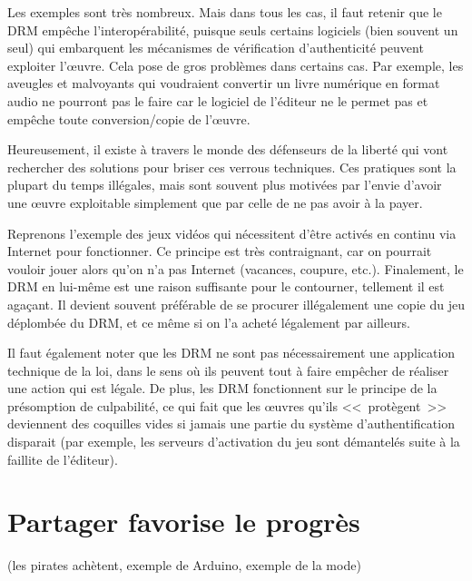 Les exemples sont très nombreux.
Mais dans tous les cas, il faut retenir que le DRM empêche l'interopérabilité, puisque seuls certains logiciels (bien souvent un seul) qui embarquent les mécanismes de vérification d'authenticité peuvent exploiter l'œuvre.
Cela pose de gros problèmes dans certains cas.
Par exemple, les aveugles et malvoyants qui voudraient convertir un livre numérique en format audio ne pourront pas le faire car le logiciel de l'éditeur ne le permet pas et empêche toute conversion/copie de l'œuvre.

Heureusement, il existe à travers le monde des défenseurs de la liberté qui vont rechercher des solutions pour briser ces verrous techniques.
Ces pratiques sont la plupart du temps illégales, mais sont souvent plus motivées par l'envie d'avoir une œuvre exploitable simplement que par celle de ne pas avoir à la payer.

Reprenons l'exemple des jeux vidéos qui nécessitent d'être activés en continu via Internet pour fonctionner.
Ce principe est très contraignant, car on pourrait vouloir jouer alors qu'on n'a pas Internet (vacances, coupure, etc.).
Finalement, le DRM en lui-même est une raison suffisante pour le contourner, tellement il est agaçant.
Il devient souvent préférable de se procurer illégalement une copie du jeu déplombée du DRM, et ce même si on l'a acheté légalement par ailleurs.

Il faut également noter que les DRM ne sont pas nécessairement une application technique de la loi, dans le sens où ils peuvent tout à faire empêcher de réaliser une action qui est légale.
De plus, les DRM fonctionnent sur le principe de la présomption de culpabilité, ce qui fait que les œuvres qu'ils <<~protègent~>> deviennent des coquilles vides si jamais une partie du système d'authentification disparait (par exemple, les serveurs d'activation du jeu sont démantelés suite à la faillite de l'éditeur).



\section{Partager favorise le progrès}
(les pirates achètent, exemple de Arduino, exemple de la mode)
